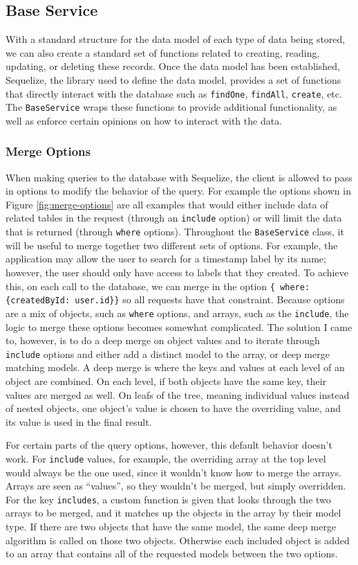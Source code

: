 \subsection{Base Service}
With a standard structure for the data model of each type of data being stored, we can also create a standard set of functions related to creating, reading, updating, or deleting these records.  Once the data model has been established, Sequelize, the library used to define the data model, provides a set of functions that directly interact with the database such as \verb!findOne!, \verb!findAll!, \verb!create!, etc.  The \verb!BaseService! wraps these functions to provide additional functionality, as well as enforce certain opinions on how to interact with the data.

\subsubsection{Merge Options}
When making queries to the database with Sequelize, the client is allowed to pass in options to modify the behavior of the query.  For example the options shown in Figure \ref{fig:merge-options} are all examples that would either include data of related tables in the request (through an \verb!include! option) or will limit the data that is returned (through \verb!where! options).  Throughout the \verb!BaseService! class, it will be useful to merge together two different sets of options.  For example, the application may allow the user to search for a timestamp label by its name; however, the user should only have access to labels that they created.  To achieve this, on each call to the database, we can merge in the option \verb!{ where: {createdById: user.id}}! so all requests have that constraint.  Because options are a mix of objects, such as \verb!where! options, and arrays, such as the \verb!include!, the logic to merge these options becomes somewhat complicated.  The solution I came to, however, is to do a deep merge on object values and to iterate through \verb!include! options and either add a distinct model to the array, or deep merge matching models.  A deep merge is where the keys and values at each level of an object are combined. On each level, if both objects have the same key, their values are merged as well.  On leafs of the tree, meaning individual values instead of nested objects, one object's value is chosen to have the overriding value, and its value is used in the final result.

For certain parts of the query options, however, this default behavior doesn't work.  For \verb!include! values, for example, the overriding array at the top level would always be the one used, since it wouldn't know how to merge the arrays. Arrays are seen as ``values'', so they wouldn't be merged, but simply overridden.  For the key \verb!includes!, a custom function is given that looks through the two arrays to be merged, and it matches up the objects in the array by their model type.  If there are two objects that have the same model, the same deep merge algorithm is called on those two objects.  Otherwise each included object is added to an array that contains all of the requested models between the two options.

